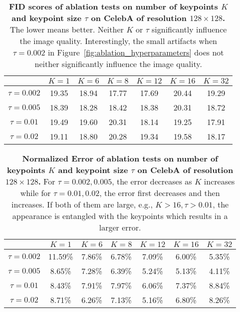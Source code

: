 \documentclass[10pt, conference, compsocconf]{IEEEtran}
\begin{document}
\begin{table*}[t]
\begin{center}
\begin{tabular}{|c|c|c|c|c|c|c|}
\hline
  & $K=1$ & $K=6$ & $K=8$ & $K=12$ & $K=16$ & $K=32$\\ 
\hline
$\tau=0.002$ & 19.35 & 18.94 & 17.77 & 17.69 & 20.44 & 19.29\\ 
$\tau=0.005$ & 18.39 & 18.28 & 18.42 & 18.38 & 20.31 & 18.72\\ 
$\tau=0.01$ & 19.49 & 19.60 & 20.31 & 18.14 & 19.25 & 17.91\\ 
$\tau=0.02$ & 19.11 & 18.80 & 20.28 & 19.34 & 19.58 & 18.17\\ 
\hline
\end{tabular}
\end{center}
\caption{\textbf{FID scores of ablation tests on number of keypoints $K$ and keypoint size $\tau$ on CelebA of resolution $128\times 128$.} The lower means better. Neither $K$ or $\tau$ significantly influence the image quality. Interestingly, the small artifacts when $\tau=0.002$ in Figure~\ref{fig:ablation_hyperparameters} does not neither significantly influence the image quality.}
\label{tab:ablation_n_keypoints_tau_fid}
\end{table*}

\begin{table*}[t]
\begin{center}
\begin{tabular}{|c|c|c|c|c|c|c|}
\hline
  & $K=1$ & $K=6$ & $K=8$ & $K=12$ & $K=16$ & $K=32$\\ 
\hline
$\tau=0.002$ & 11.59\% & 7.86\% & 6.78\% & 7.09\% & 6.00\% & 5.35\%\\ 
$\tau=0.005$ & 8.65\% & 7.28\% & 6.39\% & 5.24\% & 5.13\% & 4.11\%\\ 
$\tau=0.01$ & 8.43\% & 7.91\% & 7.97\% & 6.06\% & 7.37\% & 8.84\%\\ 
$\tau=0.02$ & 8.71\% & 6.26\% & 7.13\% & 5.16\% & 6.80\% & 8.26\%\\ 
\hline
\end{tabular}
\end{center}
\caption{\textbf{Normalized Error of ablation tests on number of keypoints $K$ and keypoint size $\tau$ on CelebA of resolution $128\times 128$.} For $\tau=0.002, 0.005$, the error decreases as $K$ increases while for $\tau=0.01, 0.02$, the error first decreases and then increases. If both of them are large, e.g., $K>16, \tau>0.01$, the appearance is entangled with the keypoints which results in a larger error.}
\label{tab:ablation_n_keypoints_tau_acc}
\end{table*}
\end{document}
